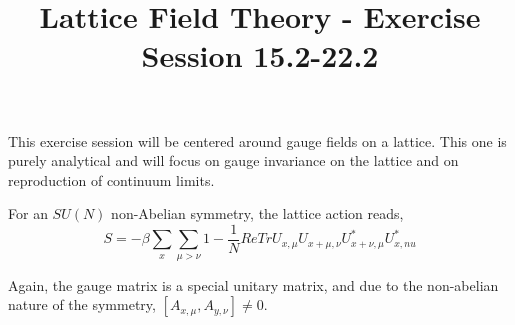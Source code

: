 \documentclass{article}
\title{Lattice Field Theory - Exercise Session 15.2-22.2}
\begin{document}
\maketitle

This exercise session will be centered around gauge fields on a lattice. This one is purely analytical and will focus on gauge invariance on the lattice and on reproduction of continuum limits.

For an $SU(N)$ non-Abelian symmetry, the lattice action reads,
\begin{equation}
S = -\beta \sum_x \sum_{\mu > \nu} 1 - \frac{1}{N} Re Tr U_{x,\mu} U_{x+\mu, \nu} U_{x+\nu, \mu}^* U_{x,nu}^* 
\end{equation}

Again, the gauge matrix is a special unitary matrix, and due to the non-abelian nature of the symmetry, $[ A_{x,\mu}, A_{y,\nu} ] \neq 0$. 
\end{document}
